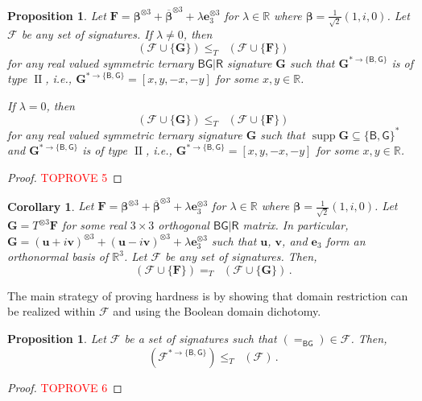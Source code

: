 \documentclass[11pt]{article}
\newtheorem{corollary}[theorem]{Corollary}
\newtheorem{proposition}[theorem]{Proposition}
\DeclareMathOperator{\holbs}{Holant^*_2}
\DeclareMathOperator{\holts}{Holant^*_3}
\DeclareMathOperator{\supp}{supp}
\DeclareMathOperator{\typeii}{II}
\newcommand{\db}{\mathsf{B}}
\newcommand{\dg}{\mathsf{G}}
\newcommand{\dr}{\mathsf{R}}
\newcommand{\teh}{^{\otimes 3}}
\newcommand{\domres}[1]{
  ^{*\to\{#1\}}
}
\begin{document}
\begin{proposition}\label{lem:Z-normalization}
  Let $\mathbf{F} = \boldsymbol{\beta} \teh + \overline{\boldsymbol{\beta}} \teh + \lambda \mathbf{e}_3 \teh$ for $\lambda \in \mathbb{R}$ where $\boldsymbol{\beta} = \frac{1}{\sqrt{2}} (1, i, 0)$.
  Let $\mathcal{F}$ be any set of signatures.
  If $\lambda \ne 0$, then
\[
  \holts(\mathcal{F} \cup \{\mathbf{G}\}) \le_T
    \holts(\mathcal{F} \cup \{\mathbf{F}\})
  \]
  for any real valued symmetric ternary $\db \dg | \dr$ signature $\mathbf{G}$ such that 
   $\mathbf{G}\domres{\db, \dg}$ is of type $\typeii$,
   i.e., $\mathbf{G}\domres{\db, \dg} = [x, y, -x, -y]$ for some $x, y \in \mathbb{R}$.

   If $\lambda = 0$, then 
   \[
  \holts(\mathcal{F} \cup \{\mathbf{G}\}) \le_T
    \holts(\mathcal{F} \cup \{\mathbf{F}\})
  \]
  for any real valued symmetric ternary signature $\mathbf{G}$ such that $\supp \mathbf{G} \subseteq \{\db, \dg \}^*$ and 
   $\mathbf{G}\domres{\db, \dg}$ is of type $\typeii$,
   i.e., $\mathbf{G}\domres{\db, \dg} = [x, y, -x, -y]$ for some $x, y \in \mathbb{R}$.
\end{proposition}
\begin{proof}\textcolor{red}{TOPROVE 5}\end{proof}

\begin{corollary}\label{cor:z-normalization-orthogonal}
Let $\mathbf{F} = \boldsymbol{\beta} \teh + \overline{\boldsymbol{\beta}} \teh + \lambda \mathbf{e}_3 \teh$ for $\lambda \in \mathbb{R}$ where $\boldsymbol{\beta} = \frac{1}{\sqrt{2}} (1, i, 0)$.
  Let $\mathbf{G} = T \teh \mathbf{F}$ for some real $3 \times 3$ orthogonal $\db \dg | \dr$ matrix.
  In particular, $\mathbf{G} = (\mathbf{u} + i \mathbf{v})\teh + (\mathbf{u} - i \mathbf{v})\teh + \lambda \mathbf{e}_3\teh$ such that $\mathbf{u}$, $\mathbf{v}$, and $\mathbf{e}_3$ form an orthonormal basis of $\mathbb{R}^3$.
  Let $\mathcal{F}$ be any set of signatures. Then,
  \[
    \holts(\mathcal{F} \cup \{\mathbf{F}\}) =_T \holts(\mathcal{F} \cup \{\mathbf{G}\}) \, .
  \]
\end{corollary}

The main strategy of proving hardness is by showing that domain restriction can be realized within $\mathcal{F}$ and using the Boolean domain dichotomy.
\begin{proposition}\label{lem:domain-restriction}
  Let $\mathcal{F}$ be a set of signatures such that $(=_{\db \dg}) \in \mathcal{F}$.
  Then,
  \[
    \holbs(\mathcal{F}\domres{\db, \dg}) \le_T \holts(\mathcal{F}) \, .
  \]
\end{proposition}
\begin{proof}\textcolor{red}{TOPROVE 6}\end{proof}
\end{document}

